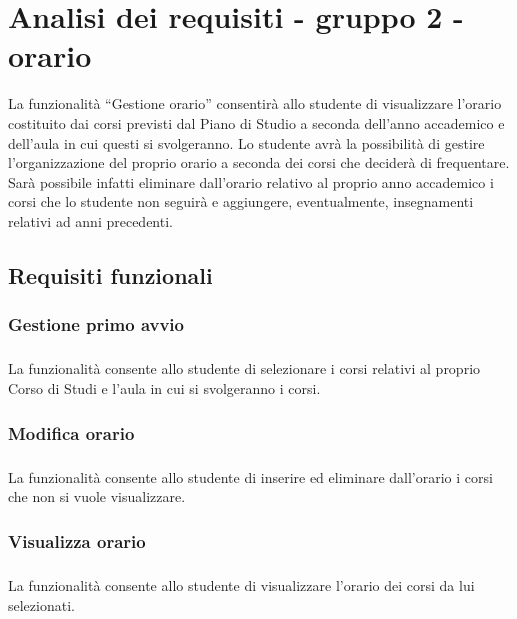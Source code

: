 
\chapter{Analisi dei requisiti - gruppo 2 - orario}
\label{ref:requisiti2-orario}

La funzionalità “Gestione orario” consentirà allo studente di visualizzare l’orario costituito dai corsi previsti dal Piano di Studio a seconda dell’anno accademico e dell’aula in cui questi si svolgeranno.  
Lo studente avrà la possibilità di gestire l’organizzazione del proprio orario a seconda dei corsi che deciderà di frequentare. Sarà possibile infatti eliminare dall’orario relativo al proprio anno accademico i corsi che lo studente non seguirà e aggiungere, eventualmente, insegnamenti relativi ad anni precedenti. 


\section{Requisiti funzionali}

\subsection{Gestione primo avvio}
\paragraph{} 
La funzionalità consente allo studente di selezionare i corsi relativi al proprio Corso di Studi e l’aula in cui si svolgeranno i corsi. 

\subsection{Modifica orario } 
\paragraph{}
La funzionalità consente allo studente di inserire ed eliminare dall’orario i corsi che non si vuole visualizzare. 

\subsection{Visualizza orario }
\paragraph{}
La funzionalità consente allo studente di visualizzare l’orario dei corsi da lui selezionati. 

